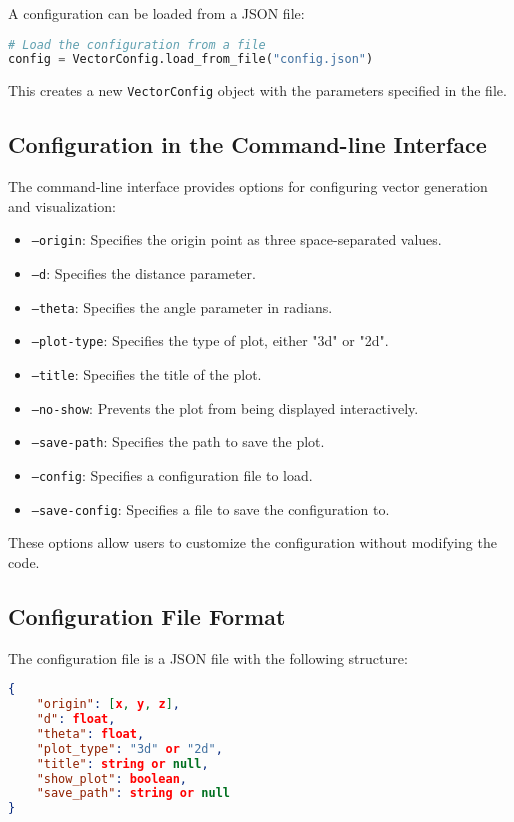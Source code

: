 A configuration can be loaded from a JSON file:

\begin{lstlisting}[language=Python]
# Load the configuration from a file
config = VectorConfig.load_from_file("config.json")
\end{lstlisting}

This creates a new \texttt{VectorConfig} object with the parameters specified in the file.

\subsection{Configuration in the Command-line Interface}

The command-line interface provides options for configuring vector generation and visualization:

\begin{itemize}
    \item \texttt{--origin}: Specifies the origin point as three space-separated values.
    \item \texttt{--d}: Specifies the distance parameter.
    \item \texttt{--theta}: Specifies the angle parameter in radians.
    \item \texttt{--plot-type}: Specifies the type of plot, either "3d" or "2d".
    \item \texttt{--title}: Specifies the title of the plot.
    \item \texttt{--no-show}: Prevents the plot from being displayed interactively.
    \item \texttt{--save-path}: Specifies the path to save the plot.
    \item \texttt{--config}: Specifies a configuration file to load.
    \item \texttt{--save-config}: Specifies a file to save the configuration to.
\end{itemize}

These options allow users to customize the configuration without modifying the code.

\subsection{Configuration File Format}

The configuration file is a JSON file with the following structure:

\begin{lstlisting}[language=JSON]
{
    "origin": [x, y, z],
    "d": float,
    "theta": float,
    "plot_type": "3d" or "2d",
    "title": string or null,
    "show_plot": boolean,
    "save_path": string or null
}
\end{lstlisting}

